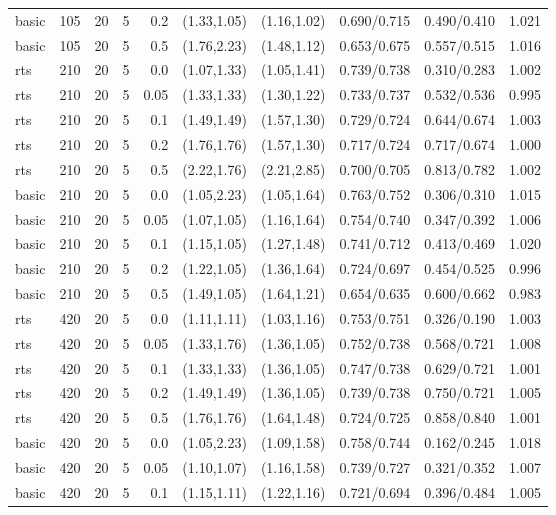 \begin{tabular}{llrrrccccc}
basic & 105 & 20 & 5 & 0.2 & (1.33,1.05) & (1.16,1.02) & 0.690/0.715 & 0.490/0.410 & 1.021 \\
basic & 105 & 20 & 5 & 0.5 & (1.76,2.23) & (1.48,1.12) & 0.653/0.675 & 0.557/0.515 & 1.016 \\
rts & 210 & 20 & 5 & 0.0 & (1.07,1.33) & (1.05,1.41) & 0.739/0.738 & 0.310/0.283 & 1.002 \\
rts & 210 & 20 & 5 & 0.05 & (1.33,1.33) & (1.30,1.22) & 0.733/0.737 & 0.532/0.536 & 0.995 \\
rts & 210 & 20 & 5 & 0.1 & (1.49,1.49) & (1.57,1.30) & 0.729/0.724 & 0.644/0.674 & 1.003 \\
rts & 210 & 20 & 5 & 0.2 & (1.76,1.76) & (1.57,1.30) & 0.717/0.724 & 0.717/0.674 & 1.000 \\
rts & 210 & 20 & 5 & 0.5 & (2.22,1.76) & (2.21,2.85) & 0.700/0.705 & 0.813/0.782 & 1.002 \\
basic & 210 & 20 & 5 & 0.0 & (1.05,2.23) & (1.05,1.64) & 0.763/0.752 & 0.306/0.310 & 1.015 \\
basic & 210 & 20 & 5 & 0.05 & (1.07,1.05) & (1.16,1.64) & 0.754/0.740 & 0.347/0.392 & 1.006 \\
basic & 210 & 20 & 5 & 0.1 & (1.15,1.05) & (1.27,1.48) & 0.741/0.712 & 0.413/0.469 & 1.020 \\
basic & 210 & 20 & 5 & 0.2 & (1.22,1.05) & (1.36,1.64) & 0.724/0.697 & 0.454/0.525 & 0.996 \\
basic & 210 & 20 & 5 & 0.5 & (1.49,1.05) & (1.64,1.21) & 0.654/0.635 & 0.600/0.662 & 0.983 \\
rts & 420 & 20 & 5 & 0.0 & (1.11,1.11) & (1.03,1.16) & 0.753/0.751 & 0.326/0.190 & 1.003 \\
rts & 420 & 20 & 5 & 0.05 & (1.33,1.76) & (1.36,1.05) & 0.752/0.738 & 0.568/0.721 & 1.008 \\
rts & 420 & 20 & 5 & 0.1 & (1.33,1.33) & (1.36,1.05) & 0.747/0.738 & 0.629/0.721 & 1.001 \\
rts & 420 & 20 & 5 & 0.2 & (1.49,1.49) & (1.36,1.05) & 0.739/0.738 & 0.750/0.721 & 1.005 \\
rts & 420 & 20 & 5 & 0.5 & (1.76,1.76) & (1.64,1.48) & 0.724/0.725 & 0.858/0.840 & 1.001 \\
basic & 420 & 20 & 5 & 0.0 & (1.05,2.23) & (1.09,1.58) & 0.758/0.744 & 0.162/0.245 & 1.018 \\
basic & 420 & 20 & 5 & 0.05 & (1.10,1.07) & (1.16,1.58) & 0.739/0.727 & 0.321/0.352 & 1.007 \\
basic & 420 & 20 & 5 & 0.1 & (1.15,1.11) & (1.22,1.16) & 0.721/0.694 & 0.396/0.484 & 1.005 \\

\end{tabular}
